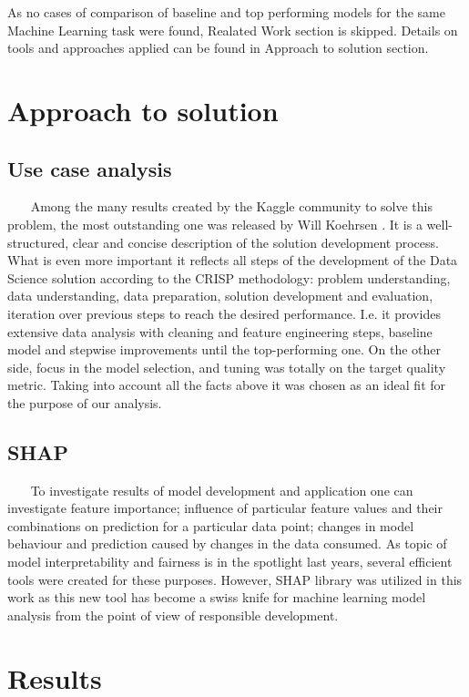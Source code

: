     As no cases of comparison of baseline and top performing models for the same Machine Learning task were found, Realated Work section is skipped. Details on tools and approaches applied can be found in Approach to solution section.
    
\section{Approach to solution}
\subsection{Use case analysis}~~~
    Among the many results created by the Kaggle community to solve this problem, the most outstanding one was released by Will Koehrsen \cite{kaggle_2}. It is a well-structured, clear and concise description of the solution development process. What is even more important it reflects all steps of the development of the Data Science solution according to the CRISP methodology: problem understanding, data understanding, data preparation, solution development and evaluation, iteration over previous steps to reach the desired performance. I.e. it provides extensive data analysis with cleaning and feature engineering steps, baseline model and stepwise improvements until the top-performing one. On the other side, focus in the model selection, and tuning was totally on the target quality metric. Taking into account all the facts above it was chosen as an ideal fit for the purpose of our analysis.
    
\subsection{SHAP}~~~
    To investigate results of model development and application one can investigate feature importance; influence of particular feature values and their combinations on prediction for a particular data point; changes in model behaviour and prediction caused by changes in the data consumed. As topic of model interpretability and fairness is in the spotlight last years, several efficient tools were created for these purposes. However, SHAP \cite{NIPS2017_7062} library was utilized in this work as this new tool has become a swiss knife for machine learning model analysis from the point of view of responsible development.
    
\section{Results}~~~

